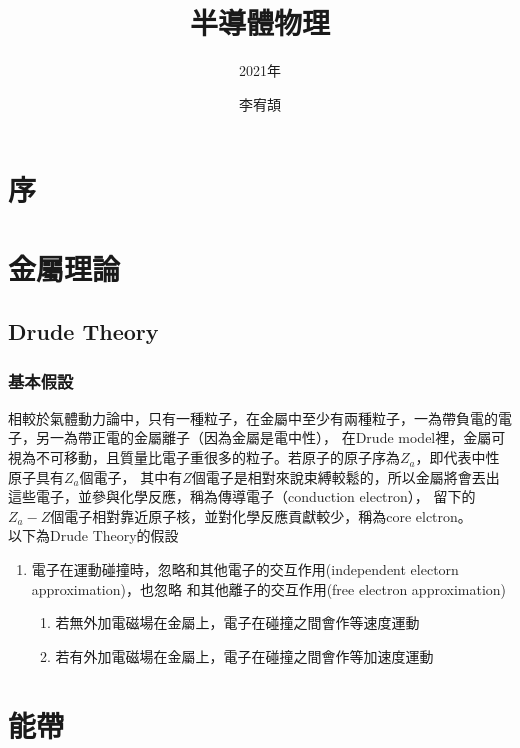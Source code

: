 \documentclass[cn,10pt,math=newtx,chinesefont=founder]{../elegantbook}
\title{半導體物理}
\subtitle{2021年}
\author{李宥頡}
\institute{National Taiwan University}
\begin{document}
\maketitle
\frontmatter

\chapter*{序}
\tableofcontents

\mainmatter

\chapter{金屬理論}
\section{Drude Theory}
\subsection{基本假設}
相較於氣體動力論中，只有一種粒子，在金屬中至少有兩種粒子，一為帶負電的電子，另一為帶正電的金屬離子（因為金屬是電中性），
在Drude model裡，金屬可視為不可移動，且質量比電子重很多的粒子。若原子的原子序為$Z_a$，即代表中性原子具有$Z_a$個電子，
其中有$Z$個電子是相對來說束縛較鬆的，所以金屬將會丟出這些電子，並參與化學反應，稱為傳導電子（conduction electron），
留下的$Z_a-Z$個電子相對靠近原子核，並對化學反應貢獻較少，稱為core elctron。\\
以下為Drude Theory的假設
\begin{enumerate}
    \item 電子在運動碰撞時，忽略和其他電子的交互作用(independent electorn approximation)，也忽略
          和其他離子的交互作用(free electron approximation)
    \begin{enumerate}
        \item  若無外加電磁場在金屬上，電子在碰撞之間會作等速度運動
        \item  若有外加電磁場在金屬上，電子在碰撞之間會作等加速度運動
    \end{enumerate}    

\end{enumerate}


\chapter{能帶}
\section{}
\end{document}
